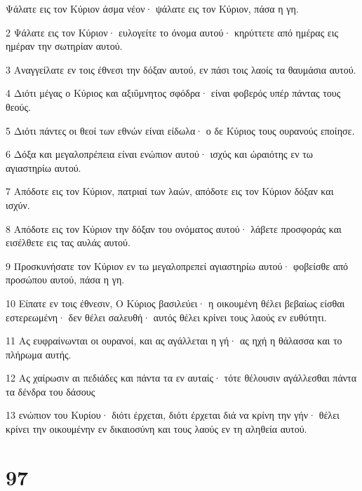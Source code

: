 \par Ψάλατε εις τον Κύριον άσμα νέον· ψάλατε εις τον Κύριον, πάσα η γη.
\par 2 Ψάλατε εις τον Κύριον· ευλογείτε το όνομα αυτού· κηρύττετε από ημέρας εις ημέραν την σωτηρίαν αυτού.
\par 3 Αναγγείλατε εν τοις έθνεσι την δόξαν αυτού, εν πάσι τοις λαοίς τα θαυμάσια αυτού.
\par 4 Διότι μέγας ο Κύριος και αξιΰμνητος σφόδρα· είναι φοβερός υπέρ πάντας τους θεούς.
\par 5 Διότι πάντες οι θεοί των εθνών είναι είδωλα· ο δε Κύριος τους ουρανούς εποίησε.
\par 6 Δόξα και μεγαλοπρέπεια είναι ενώπιον αυτού· ισχύς και ώραιότης εν τω αγιαστηρίω αυτού.
\par 7 Απόδοτε εις τον Κύριον, πατριαί των λαών, απόδοτε εις τον Κύριον δόξαν και ισχύν.
\par 8 Απόδοτε εις τον Κύριον την δόξαν του ονόματος αυτού· λάβετε προσφοράς και εισέλθετε εις τας αυλάς αυτού.
\par 9 Προσκυνήσατε τον Κύριον εν τω μεγαλοπρεπεί αγιαστηρίω αυτού· φοβείσθε από προσώπου αυτού, πάσα η γη.
\par 10 Είπατε εν τοις έθνεσιν, Ο Κύριος βασιλεύει· η οικουμένη θέλει βεβαίως είσθαι εστερεωμένη· δεν θέλει σαλευθή· αυτός θέλει κρίνει τους λαούς εν ευθύτητι.
\par 11 Ας ευφραίνωνται οι ουρανοί, και ας αγάλλεται η γή· ας ηχή η θάλασσα και το πλήρωμα αυτής.
\par 12 Ας χαίρωσιν αι πεδιάδες και πάντα τα εν αυταίς· τότε θέλουσιν αγάλλεσθαι πάντα τα δένδρα του δάσους
\par 13 ενώπιον του Κυρίου· διότι έρχεται, διότι έρχεται διά να κρίνη την γήν· θέλει κρίνει την οικουμένην εν δικαιοσύνη και τους λαούς εν τη αληθεία αυτού.

\chapter{97}

